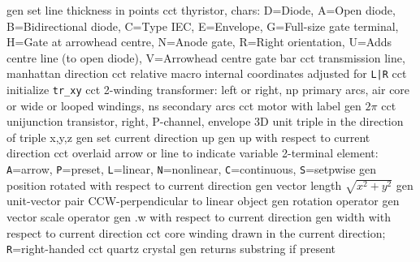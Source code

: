   {gen}
  {set line thickness in points}
  {cct}
  {thyristor, chars:
     D=Diode,
     A=Open diode,
     B=Bidirectional diode,
     C=Type IEC,
     E=Envelope,
     G=Full-size gate terminal,
     H=Gate at arrowhead centre,
     N=Anode gate,
     R=Right orientation,
     U=Adds centre line (to open diode),
     V=Arrowhead centre gate bar }
  {cct}
  {transmission line, manhattan direction}
  {cct}
  {relative macro internal coordinates adjusted for {\tt L|R}}
  {cct}
  {initialize {\tt tr\_xy}}
  {cct}
  {2-winding transformer: left or right, np primary arcs,
    air core or wide or looped windings, ns secondary arcs }
  {cct}
  {motor with label}
  {gen}
  {$2\pi$}
  {cct}
  {unijunction transistor, right, P-channel, envelope}
  {3D}
  {unit triple in the direction of triple x,y,z}
  {gen}
  {set current direction up}
  {gen}
  {up with respect to current direction}
  {cct}
  {overlaid arrow or line to indicate variable 2-terminal element:
    {\tt A}=arrow, {\tt P}=preset,
    {\tt L}=linear, {\tt N}=nonlinear, {\tt C}=continuous, {\tt S}=setpwise }
  {gen}
  {position rotated with respect to current direction}
  {gen}
  {vector length $\sqrt{x^2+y^2}$}
  {gen}
  {unit-vector pair CCW-perpendicular to linear object}
  {gen}
  {rotation operator}
  {gen}
  {vector scale operator}
  {gen}
  {.w with respect to current direction}
  {gen}
  {width with respect to current direction}
  {cct}
  {core winding drawn in the current direction; {\tt R}=right-handed}
  {cct}
  {quartz crystal}
  {gen}
  {returns substring if present}
